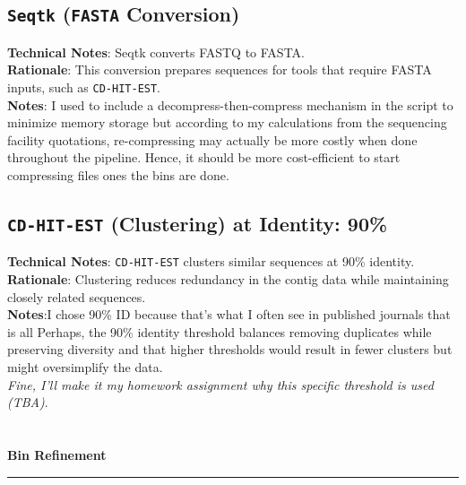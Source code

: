 \documentclass[11pt]{report}
\begin{document}
{\subsection{\texttt{Seqtk} (\texttt{FASTA} Conversion)}
\textbf{Technical Notes}: Seqtk converts FASTQ to FASTA. \\
\textbf{Rationale}: This conversion prepares sequences for tools that require FASTA inputs, such as \texttt{CD-HIT-EST}. \\
\textbf{Notes}: I used to include a decompress-then-compress mechanism in the script to minimize memory storage but according to my calculations from the sequencing facility quotations, re-compressing may actually be more costly when done throughout the pipeline. Hence, it should be more cost-efficient to start compressing files ones the bins are done. 

\subsection{\texttt{CD-HIT-EST} (Clustering) at Identity: 90\%}
\textbf{Technical Notes}: \texttt{CD-HIT-EST} clusters similar sequences at 90\% identity. \\
\textbf{Rationale}: Clustering reduces redundancy in the contig data while maintaining closely related sequences. \\ 
\textbf{Notes}:I chose 90\% ID because that's what I often see in published journals that is all Perhaps, the 90\% identity threshold balances removing duplicates while preserving diversity and that higher thresholds would result in fewer clusters but might oversimplify the data. \\
\textit{Fine, I'll make it my homework assignment why this specific threshold is used (TBA)}.
\\
\\
\\ 
\textbf{Bin Refinement} \\
\rule{\linewidth}{0.5mm}
}
\end{document}
